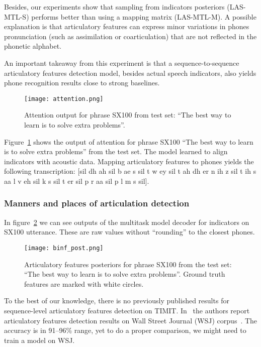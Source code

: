 \documentclass[a4paper]{article}
\begin{document}
Besides, our experiments show that sampling from indicators posteriors (LAS-MTL-S) performs better than using a mapping matrix (LAS-MTL-M). A possible explanation is that articulatory features can express minor variations in phones pronunciation (such as assimilation or coarticulation) that are not reflected in the phonetic alphabet.

An important takeaway from this experiment is that a sequence-to-sequence articulatory features detection model, besides actual speech indicators, also yields phone recognition results close to strong baselines.

\begin{figure}[ht]
  \centering
  \texttt{[image: attention.png]}
  \caption{Attention output for phrase SX100 from test set: ``The best way to learn is to solve extra problems''.}
  \label{fig:alignment}
\end{figure}

Figure~\ref{fig:alignment} shows the output of attention for phrase SX100 ``The best way to learn is to solve extra problems'' from the test set. The model learned to align indicators with acoustic data. Mapping articulatory features to phones yields the following transcription: [sil dh ah sil b ae s sil t w ey sil t ah dh er n ih z sil t ih s aa l v eh sil k s sil t er sil p r aa sil p l m s sil].

\subsubsection{Manners and places of articulation detection}

In figure~\ref{fig:binf} we can see outputs of the multitask model decoder for indicators on SX100 utterance. These are raw values without ``rounding'' to the closest phones.
\begin{figure}[ht]
  \centering
  \texttt{[image: binf\_post.png]}
  \caption{Articulatory features posteriors for phrase SX100 from the test set: ``The best way to learn is to solve extra problems''. Ground truth features are marked with white circles. }
  \label{fig:binf}
\end{figure}

To the best of our knowledge, there is no previously published results for sequence-level articulatory features detection on TIMIT. In~\cite{Qu-2018} the authors report articulatory features detection results on Wall Street Journal (WSJ) corpus~\cite{WSJ}. The accuracy is in 91--96\% range, yet to do a proper comparison, we might need to train a model on WSJ.
\end{document}
